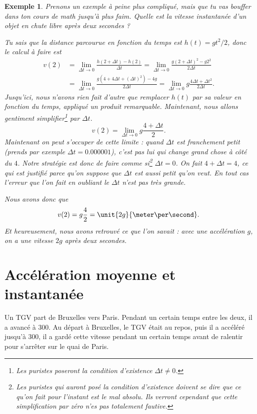 \documentclass[a4paper,12pt]{book}
\theoremstyle{mes_exemples}	\newtheorem{exemple}[numtho]{Exemple}
\theoremstyle{mes_tho}
\begin{document}
\begin{exemple}		\label{ExDerchutelobre}
Prenons un exemple à peine plus compliqué, mais que tu vas bouffer dans ton cours de math jusqu'à plus faim. Quelle est la vitesse instantanée d'un objet en chute libre après deux secondes ?

Tu sais que la distance parcourue en fonction du temps est $h(t)=gt^2/2$, donc le calcul à faire est
\begin{align*}
  v(2)	&=\lim_{\Delta t\to 0}\frac{ h(2+\Delta t)-h(2) }{ \Delta t }=\lim_{\Delta t\to 0}\frac{ g(2+\Delta t)^2-g2^2 }{ 2\Delta t }\\
	&=\lim_{\Delta t\to 0}\frac{ g(4+4\Delta t+(\Delta t)^2)-4g }{ 2\Delta t }=\lim_{\Delta t\to 0}g\frac{ 4\Delta t+\Delta t^2 }{ 2\Delta t }.
\end{align*}
Jusqu'ici, nous n'avons rien fait d'autre que remplacer $h(t)$ par sa valeur en fonction du temps, appliqué un produit remarquable. Maintenant, nous allons gentiment simplifier\footnote{Les puristes poseront la condition d'existence $\Delta t\neq 0$.} par $\Delta t$. 
\[ 
  v(2)=\lim_{\Delta t\to 0}g\frac{ 4+\Delta t }{ 2 }.
\]
Maintenant on peut s'occuper de cette limite : quand $\Delta t$ est franchement petit (prends par exemple $\Delta t=0.000001$), c'est pas lui qui change grand chose à côté du $4$. Notre stratégie est donc de \og faire comme si\footnote{Les puristes qui auront posé la condition d'existence doivent se dire que ce qu'on fait pour l'instant est le mal absolu. Ils verront cependant que cette \og simplification par zéro\fg{}  n'es pas totalement fautive.}\fg{}  $\Delta t=0$. On fait $4+\Delta t=4$, ce qui est justifié parce qu'on suppose que $\Delta t$ est aussi petit qu'on veut. En tout cas l'erreur que l'on fait en \og oubliant\fg{}  le $\Delta t$ n'est pas très grande.

Nous avons donc que
\[ 
  v(2)=g\frac{ 4 }{ 2 }=\unit{2g}{\meter\per\second}.
\]
Et heureusement, nous avons retrouvé ce que l'on savait : avec une accélération $g$, on a une vitesse $2g$ après deux secondes.
\end{exemple}

\section{Accélération moyenne et instantanée}

Un TGV part de Bruxelles vers Paris. Pendant un certain temps entre les deux, il a avancé à \unit{300}{\kilo\meter\per\hour}. Au départ à Bruxelles, le TGV était au repos, puis il a accéléré jusqu'à \unit{300}{\kilo\meter\per\hour}, il a gardé cette vitesse pendant un certain temps avant de ralentir pour s'arrêter sur le quai de Paris.
\end{document}
